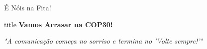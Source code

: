 \documentclass[12pt]{beamer}
\begin{document}
\begin{frame}{É Nóis na Fita!}
  \centering
  \begin{beamercolorbox}[sep=8pt,center]{title}
    \textbf{Vamos Arrasar na COP30!}
  \end{beamercolorbox}
  
  \vspace{1cm}
  
  \vspace{5mm}
  \begin{block}{}
    \centering
    \Large\textit{"A comunicação começa no sorriso e termina no 'Volte sempre!'"}
  \end{block}
\end{frame}
\end{document}
